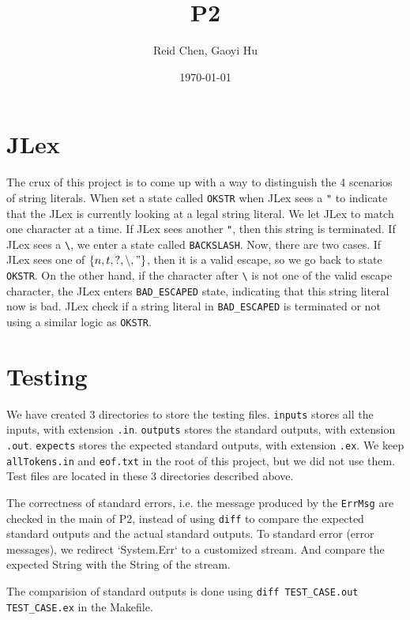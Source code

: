 \documentclass[11pt]{article}
\author{Reid Chen, Gaoyi Hu}
\date{\today}
\title{P2}
\begin{document}
\maketitle
\tableofcontents


\section{JLex}
\label{sec:org1faa337}
The crux of this project is to come up with a way to distinguish the 4 scenarios of
string literals. When set a state called \texttt{OKSTR} when JLex sees a \texttt{"} to indicate that the JLex is
currently looking at a legal string literal. We let JLex to match one
character at a time. If JLex sees another \texttt{"}, then this string is
terminated. If JLex sees a \texttt{\textbackslash{}}, we enter a state called \texttt{BACKSLASH}. Now,
there are two cases. If JLex sees one of \(\{n, t, ?, \backslash, "\}\), then it is a
valid escape, so we go back to state \texttt{OKSTR}. On the other hand, if the
character after \texttt{\textbackslash{}} is not one of the valid escape character, the JLex enters
\texttt{BAD\_ESCAPED} state, indicating that this string literal now is bad. JLex
check if a string literal in \texttt{BAD\_ESCAPED} is terminated or not using a
similar logic as \texttt{OKSTR}.
\section{Testing}
\label{sec:orgc5b5393}
We have created 3 directories to store the testing files. \texttt{inputs} stores all
the inputs, with extension \texttt{.in}. \texttt{outputs} stores the standard outputs, with
extension \texttt{.out}. \texttt{expects} stores the
expected standard outputs, with extension \texttt{.ex}. We keep \texttt{allTokens.in} and
\texttt{eof.txt} in the root of this project, but we did not use them. Test files are
located in these 3 directories described above.

The correctness of standard errors, i.e. the
message produced by the \texttt{ErrMsg} are checked in the main of P2, instead of
using \texttt{diff} to compare the expected standard outputs and the actual standard outputs.
To standard error (error messages), we redirect `System.Err` to a customized
stream. And compare the expected String with the String of the stream.

The comparision of standard outputs is done using \texttt{diff TEST\_CASE.out
  TEST\_CASE.ex} in the Makefile.
\end{document}

